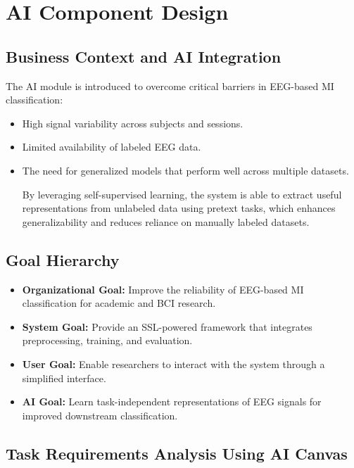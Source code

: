 \chapter{AI Component Design}
\label{ch:ai-component-design}

\section{Business Context and AI Integration}
\label{sec:business-context}

The AI module is introduced to overcome critical barriers in EEG-based MI classification:
\begin{itemize}
    \item High signal variability across subjects and sessions.
    \item Limited availability of labeled EEG data.
    \item The need for generalized models that perform well across multiple datasets.

    By leveraging self-supervised learning, the system is able to extract useful representations from unlabeled data using pretext tasks, which enhances generalizability and reduces reliance on manually labeled datasets.
\end{itemize}

\section{Goal Hierarchy}
\label{sec:goal-hierarchy}

\begin{itemize}
    \item \textbf{Organizational Goal:} Improve the reliability of EEG-based MI classification for academic and BCI research.
    \item \textbf{System Goal:} Provide an SSL-powered framework that integrates preprocessing, training, and evaluation.
    \item \textbf{User Goal:} Enable researchers to interact with the system through a simplified interface.
    \item \textbf{AI Goal:} Learn task-independent representations of EEG signals for improved downstream classification.
\end{itemize}

\section{Task Requirements Analysis Using AI Canvas}
\label{sec:task-requirements}

